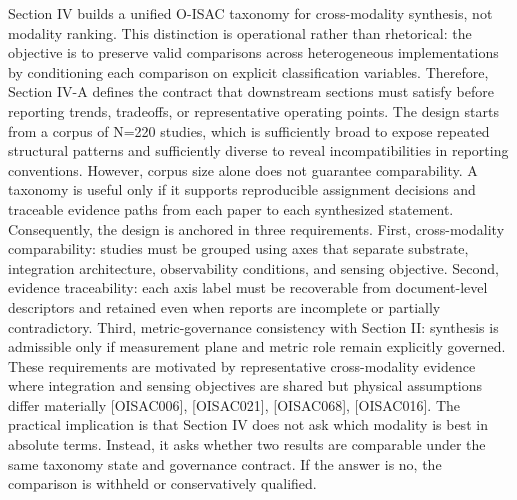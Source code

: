 {}\markdownRendererSectionBegin
{}\markdownRendererInterblockSeparator
{}\markdownRendererSectionBegin
{}\markdownRendererInterblockSeparator
{}Section IV builds a unified O-ISAC taxonomy for cross-modality synthesis, not modality ranking. This distinction is operational rather than rhetorical: the objective is to preserve valid comparisons across heterogeneous implementations by conditioning each comparison on explicit classification variables. Therefore, Section IV-A defines the contract that downstream sections must satisfy before reporting trends, tradeoffs, or representative operating points.\markdownRendererParagraphSeparator
{}The design starts from a corpus of N=220 studies, which is sufficiently broad to expose repeated structural patterns and sufficiently diverse to reveal incompatibilities in reporting conventions. However, corpus size alone does not guarantee comparability. A taxonomy is useful only if it supports reproducible assignment decisions and traceable evidence paths from each paper to each synthesized statement. Consequently, the design is anchored in three requirements. First, cross-modality comparability: studies must be grouped using axes that separate substrate, integration architecture, observability conditions, and sensing objective. Second, evidence traceability: each axis label must be recoverable from document-level descriptors and retained even when reports are incomplete or partially contradictory. Third, metric-governance consistency with Section II: synthesis is admissible only if measurement plane and metric role remain explicitly governed.\markdownRendererParagraphSeparator
{}These requirements are motivated by representative cross-modality evidence where integration and sensing objectives are shared but physical assumptions differ materially [O\markdownRendererUnderscore{}ISAC\markdownRendererUnderscore{}006], [O\markdownRendererUnderscore{}ISAC\markdownRendererUnderscore{}021], [O\markdownRendererUnderscore{}ISAC\markdownRendererUnderscore{}068], [O\markdownRendererUnderscore{}ISAC\markdownRendererUnderscore{}016]. The practical implication is that Section IV does not ask which modality is best in absolute terms. Instead, it asks whether two results are comparable under the same taxonomy state and governance contract. If the answer is no, the comparison is withheld or conservatively qualified.\markdownRendererInterblockSeparator
{}
\markdownRendererSectionEnd \markdownRendererSectionBegin
{}\markdownRendererInterblockSeparator
